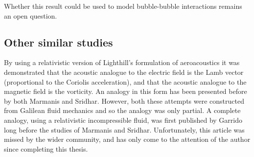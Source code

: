 Whether this result could be used to model bubble-bubble interactions remains an open question.





\subsection{Other similar studies}

By using a relativistic version of Lighthill's formulation of aeroacoustics it was demonstrated 
that the acoustic analogue to the electric field is the Lamb vector (proportional to the Coriolis acceleration),
and that the acoustic analogue to the magnetic field is the vorticity.
An analogy in this form has been presented before by both Marmanis\cite{Marmanis2000} and Sridhar\cite{Marmanis2000,Sridhar1998}.
However, both these attempts were constructed from Galilean fluid mechanics and so the analogy was only partial.
A complete  analogy, using a relativistic incompressible fluid, was first published by Garrido\cite{Garrido1982} long before the studies of Marmanis and Sridhar.  
Unfortunately, this article was missed by the wider community, 
and has only come to the attention of the author since completing this thesis.



